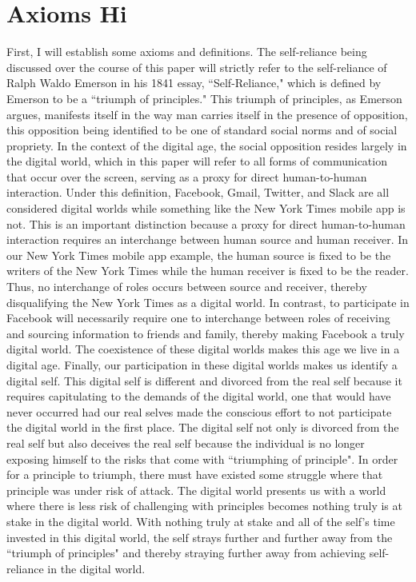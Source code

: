 \documentclass[12pt,letterpaper]{article}
\begin{document}
\section{Axioms Hi}
First, I will establish some axioms and definitions.  The self-reliance being 
discussed over the course of this paper will strictly refer to the self-reliance of 
Ralph Waldo Emerson in his 1841 essay, ``Self-Reliance," which is defined by 
Emerson to be a ``triumph of principles."  This triumph of principles, as 
Emerson argues, manifests itself in the way man carries itself in the presence 
of opposition, this opposition being identified to be one of standard social 
norms and of social propriety.  In the context of the digital age, the social opposition 
resides largely in the digital world, which in this paper will refer to all forms of 
communication that occur over the screen, serving as a proxy for direct 
human-to-human interaction.  Under this definition, Facebook, Gmail, 
Twitter, and Slack are all considered digital worlds while something like the 
New York Times mobile app is not.  This is an important distinction because a 
proxy for direct human-to-human interaction requires an interchange between 
human source and human receiver.  In our New York Times mobile app 
example, the human source is fixed to be the writers of the New York Times 
while the human receiver is fixed to be the reader.  Thus, no interchange of 
roles occurs between source and receiver, thereby disqualifying the New York 
Times as a digital world.  In contrast, to participate in Facebook will 
necessarily require one to interchange between roles of receiving and sourcing 
information to friends and family, thereby making Facebook a truly digital 
world.  The coexistence of these digital worlds makes this age we live in a 
digital age.  Finally, our participation in these digital worlds makes us identify a digital self.  This digital self is different and divorced from the real self because it requires capitulating to the demands of the digital world, one that would have never occurred had our real selves made the conscious effort to not participate the digital world in the first place.  The digital self not only is divorced from the real self but also deceives the real self because the individual is no longer exposing himself to the risks that come with ``triumphing of principle".  In order for a principle to triumph, there must have existed some struggle where that principle was under risk of attack.  The digital world presents us with a world where there is less risk of challenging with principles becomes nothing truly is at stake in the digital world.  With nothing truly at stake and all of the self's time invested in this digital world, the self strays further and further away from the ``triumph of principles" and thereby straying further away from achieving self-reliance in the digital world.
\end{document}
